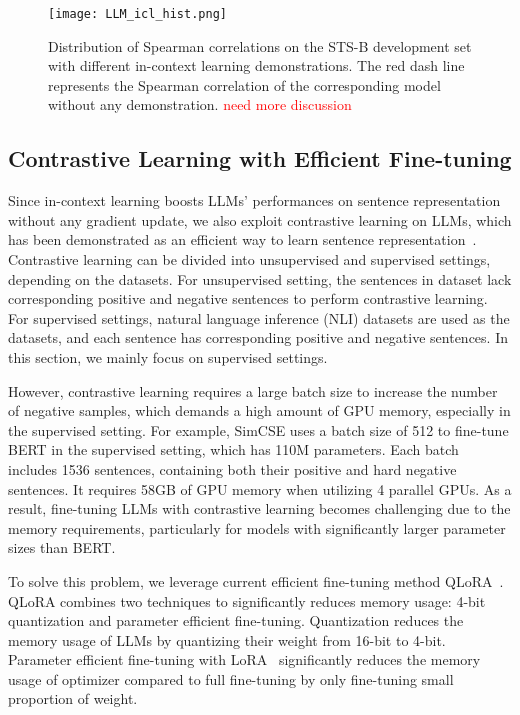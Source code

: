 \documentclass{article}
\begin{document}
\begin{figure}
\centering
\texttt{[image: LLM\_icl\_hist.png]}
\caption{
  Distribution of Spearman correlations on the STS-B development set with different in-context learning demonstrations.
  The red dash line represents the Spearman correlation of the corresponding model without any demonstration.
  \textcolor{red}{need more discussion}
}
\label{fig:LLM_icl_hist}
\end{figure}


\subsection{Contrastive Learning with Efficient Fine-tuning}
\label{sec:contrastive_method}

Since in-context learning boosts LLMs' performances on sentence representation without any gradient update,
we also exploit contrastive learning on LLMs, which has been demonstrated as an efficient way to learn sentence representation~\cite{gao2021simcse}.
Contrastive learning can be divided into unsupervised and supervised settings, depending on the datasets.
For unsupervised setting, the sentences in dataset lack corresponding positive and negative sentences to perform contrastive learning.
For supervised settings, natural language inference (NLI) datasets are used as the datasets, and each sentence has corresponding positive and negative sentences.
In this section, we mainly focus on supervised settings.

However, contrastive learning requires a large batch size to increase the number of negative samples, which demands a high amount of GPU memory, especially in the supervised setting.
For example, SimCSE uses a batch size of 512 to fine-tune BERT in the supervised setting, which has 110M parameters. Each batch includes 1536 sentences, containing both their positive and hard negative sentences. It requires 58GB of GPU memory when utilizing 4 parallel GPUs.
As a result, fine-tuning LLMs with contrastive learning becomes challenging due to the memory requirements, particularly for models with significantly larger parameter sizes than BERT. 


To solve this problem, we leverage current efficient fine-tuning method QLoRA~\cite{dettmers2023qlora}.
QLoRA combines two techniques to significantly reduces memory usage: 4-bit quantization and parameter efficient fine-tuning.
Quantization reduces the memory usage of LLMs by quantizing their weight from 16-bit to 4-bit.
Parameter efficient fine-tuning with LoRA~\cite{hu2021lora} significantly reduces the memory usage of optimizer compared to full fine-tuning by only fine-tuning small proportion of weight.
\end{document}
